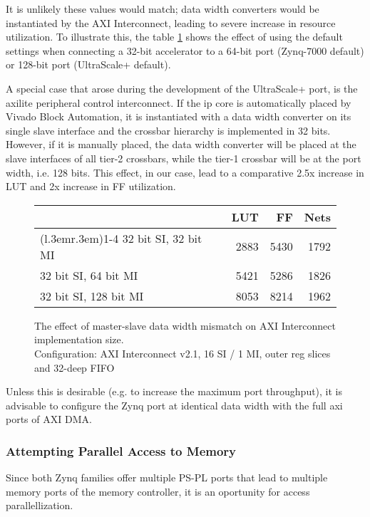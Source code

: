 It is unlikely these values would match; data width converters would be instantiated by
the AXI Interconnect, leading to severe increase in resource utilization.
To illustrate this, the table \ref{tab:int-dw} shows the effect of using the default
settings when connecting a 32-bit accelerator to a 64-bit port (Zynq-7000 default)
or 128-bit port (UltraScale+ default).

A special case that arose during the development of the UltraScale+ port,
is the \gls{axilite} peripheral control interconnect. 
If the ip core is automatically placed by Vivado Block Automation,
it is instantiated with a data width converter on its single slave interface
and the crossbar hierarchy is implemented in 32 bits.
However, if it is manually placed, the data width converter will be placed
at the slave interfaces of all tier-2 crossbars, while the tier-1 crossbar will be
at the port width, i.e. 128 bits. 
This effect, in our case, lead to a comparative 2.5x increase in LUT and 2x increase in FF utilization.


\begin{figure}[ht!]
\centering
\begin{tabular}{lrrr}
\toprule
			& LUT	& FF	& Nets \\
\cmidrule(l{.3em}r{.3em}){1-4}
32 bit SI, 32 bit MI	& 2883 & 5430 & 1792 \\
32 bit SI, 64 bit MI	& 5421	&5286	&1826	\\
32 bit SI, 128 bit MI	& 8053	&8214	&1962	\\
\bottomrule
\end{tabular}
\caption{The effect of master-slave data width mismatch on AXI Interconnect implementation size.\\
	Configuration: AXI Interconnect v2.1, 16 SI / 1 MI, outer reg slices and 32-deep FIFO}
\label{tab:int-dw}
\end{figure}

Unless this is desirable (e.g. to increase the maximum port throughput),
it is advisable to configure the Zynq port at identical data width with the
full \gls{axi} ports of AXI DMA.

\subsubsection{Attempting Parallel Access to Memory}

Since both Zynq families offer multiple PS-PL ports that lead to 
multiple memory ports of the memory controller,
it is an oportunity for access parallellization.


